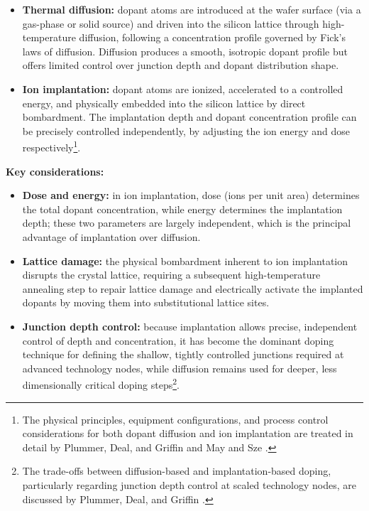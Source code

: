 \documentclass[10pt,a4paper]{article}
\begin{document}
\begin{itemize}
    \item \textbf{Thermal diffusion:} dopant atoms are introduced at the wafer 
    surface (via a gas-phase or solid source) and driven into the silicon 
    lattice through high-temperature diffusion, following a concentration 
    profile governed by Fick's laws of diffusion. Diffusion produces a smooth, 
    isotropic dopant profile but offers limited control over junction depth and 
    dopant distribution shape.
    \item \textbf{Ion implantation:} dopant atoms are ionized, accelerated to a 
    controlled energy, and physically embedded into the silicon lattice by 
    direct bombardment. The implantation depth and dopant concentration profile 
    can be precisely controlled independently, by adjusting the ion energy and 
    dose respectively\footnote{The physical principles, equipment 
    configurations, and process control considerations for both dopant 
    diffusion and ion implantation are treated in detail by Plummer, Deal, and 
    Griffin \cite{plummer2000} and May and Sze \cite{maysze2004}.}.
\end{itemize}

\textbf{Key considerations:}
\begin{itemize}
    \item \textbf{Dose and energy:} in ion implantation, dose (ions per unit 
    area) determines the total dopant concentration, while energy determines 
    the implantation depth; these two parameters are largely independent, which 
    is the principal advantage of implantation over diffusion.
    \item \textbf{Lattice damage:} the physical bombardment inherent to ion 
    implantation disrupts the crystal lattice, requiring a subsequent 
    high-temperature annealing step to repair lattice damage and electrically 
    activate the implanted dopants by moving them into substitutional lattice 
    sites.
    \item \textbf{Junction depth control:} because implantation allows precise, 
    independent control of depth and concentration, it has become the dominant 
    doping technique for defining the shallow, tightly controlled junctions 
    required at advanced technology nodes, while diffusion remains used for 
    deeper, less dimensionally critical doping steps\footnote{The trade-offs 
    between diffusion-based and implantation-based doping, particularly 
    regarding junction depth control at scaled technology nodes, are discussed 
    by Plummer, Deal, and Griffin \cite{plummer2000}.}.
\end{itemize}
\end{document}
